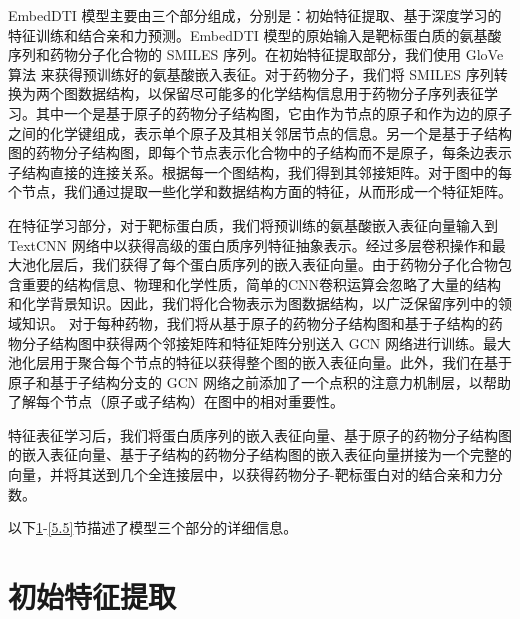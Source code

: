 EmbedDTI 模型主要由三个部分组成，分别是：初始特征提取、基于深度学习的特征训练和结合亲和力预测。EmbedDTI 模型的原始输入是靶标蛋白质的氨基酸序列和药物分子化合物的 SMILES 序列。在初始特征提取部分，我们使用 GloVe 算法 \cite{pennington2014glove} 来获得预训练好的氨基酸嵌入表征。对于药物分子，我们将 SMILES 序列转换为两个图数据结构，以保留尽可能多的化学结构信息用于药物分子序列表征学习。其中一个是基于原子的药物分子结构图，它由作为节点的原子和作为边的原子之间的化学键组成，表示单个原子及其相关邻居节点的信息。另一个是基于子结构图的药物分子结构图，即每个节点表示化合物中的子结构而不是原子，每条边表示子结构直接的连接关系。根据每一个图结构，我们得到其邻接矩阵。对于图中的每个节点，我们通过提取一些化学和数据结构方面的特征，从而形成一个特征矩阵。

在特征学习部分，对于靶标蛋白质，我们将预训练的氨基酸嵌入表征向量输入到 TextCNN 网络中以获得高级的蛋白质序列特征抽象表示。经过多层卷积操作和最大池化层后，我们获得了每个蛋白质序列的嵌入表征向量。由于药物分子化合物包含重要的结构信息、物理和化学性质，简单的CNN卷积运算会忽略了大量的结构和化学背景知识。因此，我们将化合物表示为图数据结构，以广泛保留序列中的领域知识。
对于每种药物，我们将从基于原子的药物分子结构图和基于子结构的药物分子结构图中获得两个邻接矩阵和特征矩阵分别送入 GCN 网络进行训练。最大池化层用于聚合每个节点的特征以获得整个图的嵌入表征向量。此外，我们在基于原子和基于子结构分支的 GCN 网络之前添加了一个点积的注意力机制层，以帮助了解每个节点（原子或子结构）在图中的相对重要性。

特征表征学习后，我们将蛋白质序列的嵌入表征向量、基于原子的药物分子结构图的嵌入表征向量、基于子结构的药物分子结构图的嵌入表征向量拼接为一个完整的向量，并将其送到几个全连接层中，以获得药物分子-靶标蛋白对的结合亲和力分数。

以下\ref{5.3}-\ref{5.5}节描述了模型三个部分的详细信息。


\section{初始特征提取} \label{5.3}
